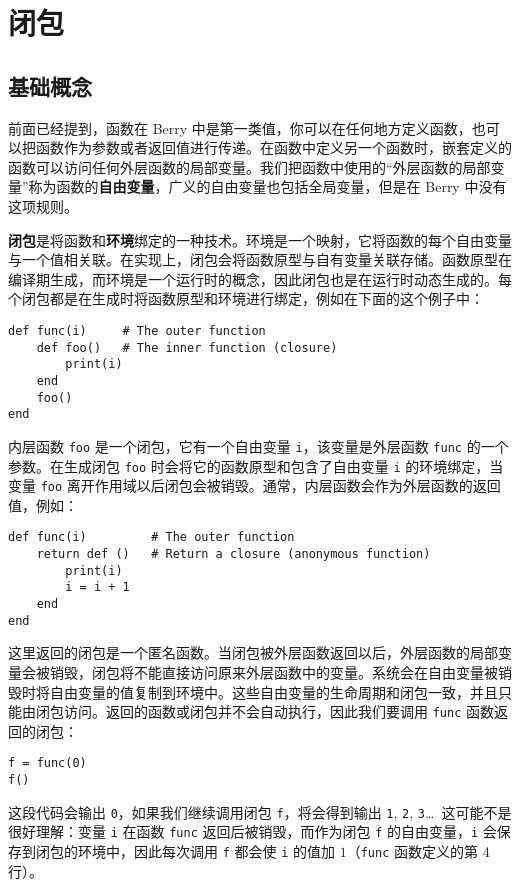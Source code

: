 \section{闭包}

\subsection{基础概念}

前面已经提到，函数在 Berry 中是第一类值，你可以在任何地方定义函数，也可以把函数作为参数或者返回值进行传递。在函数中定义另一个函数时，嵌套定义的函数可以访问任何外层函数的局部变量。我们把函数中使用的``外层函数的局部变量''称为函数的\textbf{自由变量}，广义的自由变量也包括全局变量，但是在 Berry 中没有这项规则。

\textbf{闭包}是将函数和\textbf{环境}绑定的一种技术。环境是一个映射，它将函数的每个自由变量与一个值相关联。在实现上，闭包会将函数原型与自有变量关联存储。函数原型在编译期生成，而环境是一个运行时的概念，因此闭包也是在运行时动态生成的。每个闭包都是在生成时将函数原型和环境进行绑定，例如在下面的这个例子中：
\begin{lstlisting}[language=berry]
def func(i)     # The outer function
    def foo()   # The inner function (closure)
        print(i)
    end
    foo()
end
\end{lstlisting}
内层函数 \texttt{foo} 是一个闭包，它有一个自由变量 \texttt{i}，该变量是外层函数 \texttt{func} 的一个参数。在生成闭包 \texttt{foo} 时会将它的函数原型和包含了自由变量 \texttt{i} 的环境绑定，当变量 \texttt{foo} 离开作用域以后闭包会被销毁。通常，内层函数会作为外层函数的返回值，例如：
\begin{lstlisting}[language=berry]
def func(i)         # The outer function
    return def ()   # Return a closure (anonymous function)
        print(i)
        i = i + 1
    end
end
\end{lstlisting}
这里返回的闭包是一个匿名函数。当闭包被外层函数返回以后，外层函数的局部变量会被销毁，闭包将不能直接访问原来外层函数中的变量。系统会在自由变量被销毁时将自由变量的值复制到环境中。这些自由变量的生命周期和闭包一致，并且只能由闭包访问。返回的函数或闭包并不会自动执行，因此我们要调用 \texttt{func} 函数返回的闭包：
\begin{lstlisting}[language=berry]
f = func(0)
f()
\end{lstlisting}
这段代码会输出 \texttt{0}，如果我们继续调用闭包 \texttt{f}，将会得到输出 \texttt{1}, \texttt{2}, \texttt{3}\ldots\ 这可能不是很好理解：变量 \texttt{i} 在函数 \texttt{func} 返回后被销毁，而作为闭包 \texttt{f} 的自由变量，\texttt{i} 会保存到闭包的环境中，因此每次调用 \texttt{f} 都会使 \texttt{i} 的值加 $1$（\texttt{func} 函数定义的第 4 行）。

